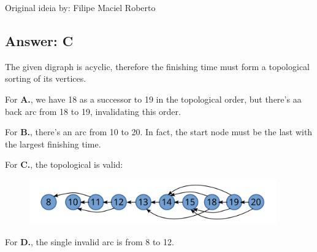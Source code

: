 Original ideia by: Filipe Maciel Roberto


\subsection*{Answer: C}

The given digraph is acyclic, therefore the finishing time must form a topological sorting of its vertices.

For \textbf{A.}, we have 18 as a successor to 19 in the topological order, but there's aa back arc from 18 to 19, invalidating this order.

For \textbf{B.}, there's an arc from 10 to 20. In fact, the start node must be the last with the largest finishing time.

For \textbf{C.}, the topological is valid:

\begin{figure}[H]
    \centering
    \includegraphics[width=0.95\textwidth]{images/119.pdf}
\end{figure}

For \textbf{D.}, the single invalid arc is from 8 to 12.
